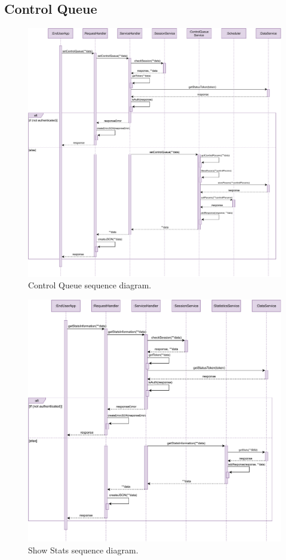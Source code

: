 \subsection{Control Queue}

\begin{figure}[H]
	\centering
	\includegraphics[width=1.0\textwidth]{images/controlQueue_sequence_diagram.pdf}
	\caption{Control Queue sequence diagram.}
\end{figure}

\begin{figure}[H]
	\centering
	\includegraphics[width=1.0\textwidth]{images/showStats_sequence_diagram.pdf}
	\caption{Show Stats sequence diagram.}
\end{figure}

